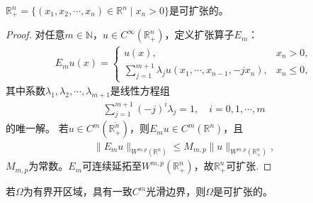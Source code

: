 \documentclass[../../main.tex]{subfiles}%
\begin{document}
\begin{example}
$\mathbb{R}_{+}^{n}=\{(x_{1},x_{2},\cdots,x_{n})\in\mathbb{R}^{n}\mid x_{n}>0\}$是可扩张的。
\end{example}

\begin{proof}
对任意$m\in\mathbb{N}$，$u\in C^{\infty}(\mathbb{R}_{+}^{n})$，定义扩张算子$E_{m}$：
\begin{align*}
E_{m}u(x)=
\begin{cases}
u(x),&x_{n}>0,\\
\sum\limits_{j=1}^{m+1}\lambda_{j}u(x_{1},\cdots,x_{n-1},-jx_{n}),&x_{n}\leqslant 0,
\end{cases}
\end{align*}
其中系数$\lambda_{1},\lambda_{2},\cdots,\lambda_{m+1}$是线性方程组
\begin{align*}
\sum\limits_{j=1}^{m+1}(-j)^{i}\lambda_{j}=1,\quad i=0,1,\cdots,m
\end{align*}
的唯一解。
若$u\in C^{m}(\overline{\mathbb{R}_{+}^{n}})$，则$E_{m}u\in C^{m}(\mathbb{R}^{n})$，且
\begin{align*}
\|E_{m}u\|_{W^{m,p}(\mathbb{R}^{n})}\leqslant M_{m,p}\|u\|_{W^{m,p}(\mathbb{R}_{+}^{n})},
\end{align*}
$M_{m,p}$为常数。$E_{m}$可连续延拓至$W^{m,p}(\mathbb{R}_{+}^{n})$，故$\mathbb{R}_{+}^{n}$可扩张.
\end{proof}

\begin{example}
若$\Omega$为有界开区域，具有一致$C^{m}$光滑边界，则$\Omega$是可扩张的。
\end{example}
\end{document}
